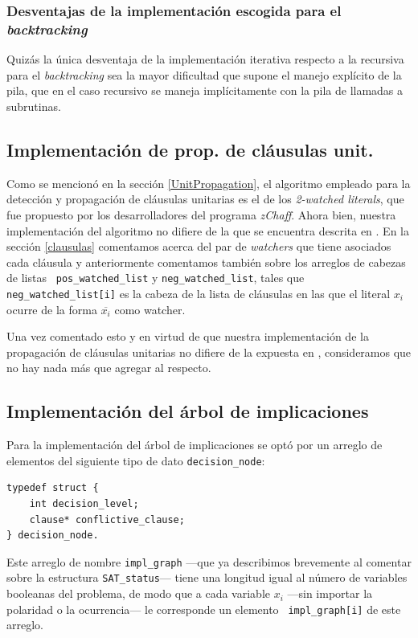 \documentclass[12pt,lettersize,oneside]{article}
\begin{document}
\subsubsection{Desventajas de la implementación escogida para el \emph{backtracking}}
Quizás la única desventaja de la implementación iterativa respecto a la
recursiva para el \emph{backtracking} sea la mayor dificultad que supone el
manejo explícito de la pila, que en el caso recursivo se maneja implícitamente
con la pila de llamadas a subrutinas.


\subsection{Implementación de prop. de cláusulas unit.}
Como se mencionó en la sección \ref{UnitPropagation}, el algoritmo empleado para
la detección y propagación de cláusulas unitarias es el de los \emph{2-watched
  literals}, que fue propuesto por los desarrolladores del programa
\emph{zChaff}. Ahora bien, nuestra implementación del algoritmo no difiere de la
que se encuentra descrita en \cite{Zhang}. En la sección \ref{clausulas}
comentamos acerca del par de \emph{watchers} que tiene asociados cada cláusula y
anteriormente comentamos también sobre los arreglos de cabezas de listas {\tt
  pos\_watched\_list} y {\tt neg\_watched\_list}, tales que  {\tt
  neg\_watched\_list[i]} es la cabeza de la lista de cláusulas en las que el
literal $x_i$ ocurre de la forma $\overline{x_i}$ como watcher.

Una vez comentado esto y en virtud de que nuestra implementación de la
propagación de cláusulas unitarias no difiere de la expuesta en \cite{Zhang},
consideramos que no hay nada más que agregar al respecto.

\subsection{Implementación del árbol de implicaciones}\label{impl}
Para la implementación del árbol de implicaciones se optó por un arreglo de
elementos del siguiente tipo de dato {\tt decision\_node}:
\begin{lstlisting}
typedef struct {
    int decision_level;
    clause* conflictive_clause;
} decision_node.
\end{lstlisting}
Este arreglo de nombre {\tt impl\_graph} ---que ya describimos brevemente al
comentar sobre la estructura {\tt SAT\_status}--- tiene una longitud igual al
número de variables booleanas del problema, de modo que a cada variable $x_i$
---sin importar la polaridad o la ocurrencia--- le corresponde un elemento {\tt
  impl\_graph[i]} de este arreglo.
\end{document}
